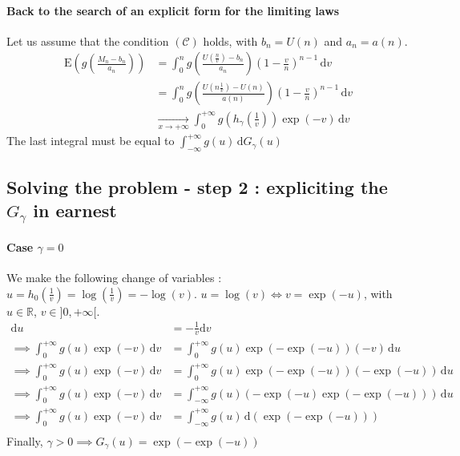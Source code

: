 \paragraph{Back to the search of an explicit form for the limiting laws} Let us assume that the condition $(\mathcal{C})$ holds, with $b_n = U(n)$ and $a_n = a(n)$.
\begin{equation}
\begin{alignat*}{2}
\mathrm{E}(g(\frac{M_n - b_n}{a_n})) &= \int_0^n \! g(\frac{U(\frac{n}{v}) - b_n}{a_n}) (1 - \frac{v}{n})^{n - 1}\, \mathrm{d}v \\
&= \int_0^n \! g(\frac{U(n \frac{1}{v}) - U(n)}{a(n)}) (1 - \frac{v}{n})^{n - 1}\, \mathrm{d}v \\
&\xrightarrow[x \rightarrow + \infty]{} \int_0^{+ \infty} \! g(h_\gamma(\frac{1}{v})) \exp(- v)\, \mathrm{d}v
\end{alignat*}
\end{equation}The last integral must be equal to $\int_{- \infty}^{+ \infty} \! g(u) \, \mathrm{d}G_\gamma(u)$

\subsection{Solving the problem - step 2 : expliciting the $G_\gamma$ in earnest}
\paragraph{Case $\gamma = 0$} We make the following change of variables : $u = h_0(\frac{1}{v}) = \log(\frac{1}{v}) = - \log(v)$. \newline
$u = \log(v) \iff v = \exp(-u)$, with $u \in \mathbb{R}$, $v \in ]0,+ \infty[$.
\begin{equation}
\begin{alignat*}{2}
\mathrm{d}u &= - \frac{1}{v} \mathrm{d}v \\
\implies \int_0^{+ \infty} \! g(u) \exp(- v)\, \mathrm{d}v &= \int_0^{+ \infty} \! g(u) \exp(- \exp(- u)) (- v)\, \mathrm{d}u \\
\implies \int_0^{+ \infty} \! g(u) \exp(- v)\, \mathrm{d}v &= \int_0^{+ \infty} \! g(u) \exp(- \exp(- u)) (- \exp(- u))\, \mathrm{d}u \\
\implies \int_0^{+ \infty} \! g(u) \exp(- v)\, \mathrm{d}v &= \int_{- \infty}^{+ \infty} \! g(u) ( - \exp(- u)\exp(- \exp(- u))) \, \mathrm{d}u \\
\implies \int_0^{+ \infty} \! g(u) \exp(- v)\, \mathrm{d}v &= \int_{- \infty}^{+ \infty} \! g(u) \, \mathrm{d}(\exp(- \exp(- u))) \\
\end{alignat*}
\end{equation}
Finally, \underline{$\gamma > 0 \implies G_\gamma(u) = \exp(- \exp(- u)) $}
